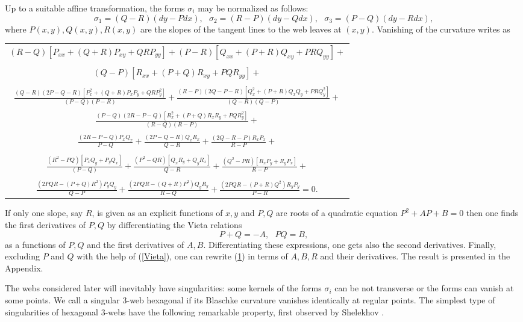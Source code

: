 \documentclass[11pt,a4paper]{article}
\begin{document}
Up to a suitable affine transformation, the forms $\sigma_i$ may be normalized as follows: 
$$
\sigma_1=(Q - R)(dy - Pdx), \ \ \ \sigma_2=(R - P)(dy - Qdx), \ \ \ \sigma_3=(P - Q)(dy - Rdx),
$$
where $P(x,y),Q(x,y),R(x,y)$ are the slopes of the tangent lines to the web leaves at $(x,y)$.   Vanishing of the curvature writes as 

\begin{longtable}{c}\label{curvature}
$(R-Q )[P_{xx} +(Q + R)P_{xy} +QRP_{yy}]+(P-R)[Q_{xx} +(P + R)Q_{xy}+PRQ_{yy}]+$\\
  \\
$ (Q - P)[R_{xx} +(P + Q)R_{xy}+PQR_{yy}]+$\\
   \\
  $ \frac{(Q - R)(2P - Q - R)[P^2_x+(Q+R)P_xP_y+QRP^2_y]}{(P-Q )(P - R)} + 
   \frac{(R-P )(2Q -P- R)[Q^2_x+(P+R)Q_xQ_y+PRQ_y^2]}{(Q - R)(Q-P)}+$\\
     \\
 $  \frac{(P - Q)(2R-P-Q)[R_x^2+(P+Q)R_xR_y+PQR_y^2]}{(R-Q)(R - P)}+$\\
   \\
   $\frac{(2R-P-Q)P_xQ_x }{P-Q}+
   \frac{(2P-Q-R)Q_xR_x}{Q - R}+   
   \frac{(2Q-R-P)R_xP_x}{R-P} +$\\
   \\
   $\frac{ (R^2-PQ)[P_xQ_y+P_yQ_x]}{(P - Q)} +
   \frac{(P^2 - QR)[Q_xR_y+Q_yR_x]}{Q-R} +
   \frac{(Q^2-PR)[R_xP_y+R_yP_x]}{R-P} +$\\
     \\
$\frac{(2PQR -(P+Q)R^2)P_yQ_y}{Q-P} +
\frac{(2PQR-(Q+R)P^2)Q_yR_y}{R-Q} +
\frac{(2PQR-(P+R)Q^2)R_yP_y }{P-R} =0.$
\end{longtable}

If only one  slope, say $R$, is   given as an explicit functions of $x,y$ and $P,Q$ are  roots of a quadratic equation $P^2+AP+B=0$ then one finds the first derivatives of $P,Q$ by differentiating the Vieta relations 
\begin{equation}\label{Vieta}
P+Q=-A,\ \ \ PQ=B,
\end{equation}
as a functions of $P,Q$ and the first derivatives of $A,B$. Differentiating these expressions, one gets also the second derivatives. Finally, excluding $P$ and $Q$ with the help of (\ref{Vieta}), one can  rewrite (\ref{curvature}) in terms of $A,B,R$ and their derivatives. The result is presented in the Appendix. 

The webs considered later will inevitably have singularities: some kernels of the forms $\sigma_i$ can be not transverse or the forms  can vanish at some points. We call a singular  3-web hexagonal if its Blaschke curvature vanishes identically at regular points.  The simplest type of singularities of hexagonal 3-webs have the following remarkable  property, first observed by Shelekhov \cite{S-05}. 
\end{document}
